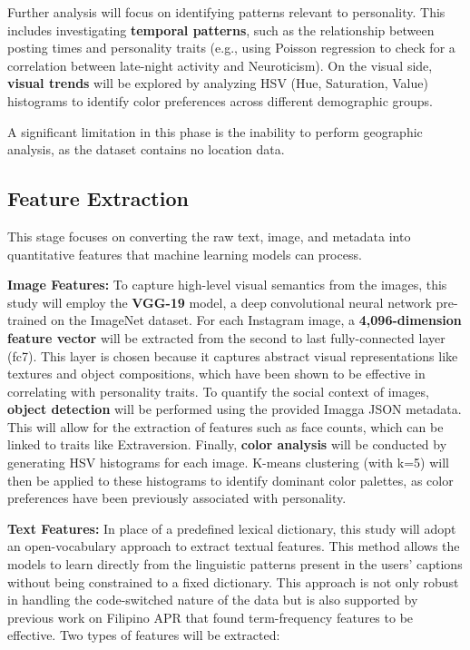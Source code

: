 Further analysis will focus on identifying patterns relevant to personality. This includes investigating \textbf{temporal patterns}, such as the relationship between posting times and personality traits (e.g., using Poisson regression to check for a correlation between late-night activity and Neuroticism). On the visual side, \textbf{visual trends }will be explored by analyzing HSV (Hue, Saturation, Value) histograms to identify color preferences across different demographic groups.

A significant limitation in this phase is the inability to perform geographic analysis, as the dataset contains no location data.

\subsection{Feature Extraction}
\label{subsec:features}

This stage focuses on converting the raw text, image, and metadata into quantitative features that machine learning models can process.

\textbf{Image Features:}
To capture high-level visual semantics from the images, this study will employ the \textbf{VGG-19} model, a deep convolutional neural network pre-trained on the ImageNet dataset. For each Instagram image, a \textbf{4,096-dimension feature vector} will be extracted from the second to last fully-connected layer (fc7). This layer is chosen because it captures abstract visual representations like textures and object compositions, which have been shown to be effective in correlating with personality traits. To quantify the social context of images, \textbf{object detection} will be performed using the provided Imagga JSON metadata. This will allow for the extraction of features such as face counts, which can be linked to traits like Extraversion. Finally, \textbf{color analysis} will be conducted by generating HSV histograms for each image. K-means clustering (with k=5) will then be applied to these histograms to identify dominant color palettes, as color preferences have been previously associated with personality.

\textbf{Text Features:}
In place of a predefined lexical dictionary, this study will adopt an open-vocabulary approach to extract textual features. This method allows the models to learn directly from the linguistic patterns present in the users' captions without being constrained to a fixed dictionary. This approach is not only robust in handling the code-switched nature of the data but is also supported by previous work on Filipino APR that found term-frequency features to be effective. Two types of features will be extracted:

